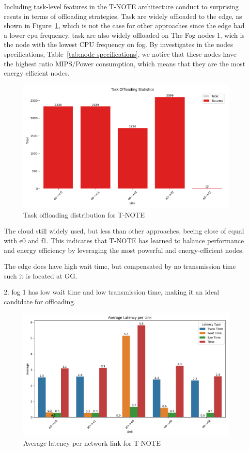 \documentclass[preprint,3p,authoryear]{elsarticle}
\begin{document}
Including task-level features in the T-NOTE architecture conduct to surprising resuts in terms of offloading strategies. Task are widely offloaded to the edge, as shown in Figure~\ref{fig:T-NOTE-offloading-stats}, which is not the case for other approaches since the edge had a lower cpu frequency. task are also widely offloaded on The Fog nodes 1, wich is the node with the lowest CPU frequency on fog. By investigates in the nodes specifications, Table~\ref{tab:node-specifications}, we notice that these nodes have the highest ratio MIPS/Power consumption, which means that they are the most energy efficient nodes. 
\begin{figure}[H]
    \centering
    \includegraphics[width=0.5\linewidth]{figs/T-NOTE/task_offloading_statistics.png}
    \caption{Task offloading distribution for T-NOTE}
    \label{fig:T-NOTE-offloading-stats}
\end{figure}

The cloud still widely used, but less than other approaches, beeing close of equal with e0 and f1. This indicates that T-NOTE has learned to balance performance and energy efficiency by leveraging the most powerful and energy-efficient nodes. 

The 
edge does have high wait time, but compensated by no transmission time such it is located at GG.

2. fog 1 has low wait time and low transmission time, making it an ideal candidate for offloading.

\begin{figure}[H]
    \centering
    \includegraphics[width=0.5\linewidth]{figs/T-NOTE/avg_latency_per_link.png}
    \caption{Average latency per network link for T-NOTE}
    \label{fig:T-NOTE-avg-latency}
\end{figure}
\end{document}
